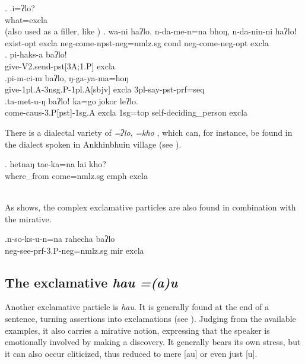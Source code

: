 \ex. \ag.i=ʔlo?\\
what{\sc =excla}\\
 (also used as a filler, like )
\bg. wa-ni haʔlo. n-da-me-n=na bhoŋ, n-da-nin-ni haʔloǃ\\
			exist{\sc [3sg]-opt} {\sc excla} {\sc neg-}come{\sc [3sg]-npst-neg=nmlz.sg} {\sc cond} {\sc neg-}come{\sc [3sg]-neg-opt} {\sc excla}\\
	\bg. pi-haks-a baʔlo!\\
	give{\sc -V2.send-pst[3A;1.P]} {\sc excla}\\
	 
\bg.pi-m-ci-m baʔlo, ŋ-ga-ya-ma=hoŋ\\
 give{\sc -1pl.A-3nsg.P-1pl.A[sbjv]} {\sc excla} {\sc 3pl-}say{\sc -pst-prf=seq}\\
  \bg.ta-met-u-ŋ baʔloǃ  ka=go     jokor leʔlo.\\
come{\sc -caus-3.P[pst]-1sg.A} {\sc excla} {\sc 1sg=top} self-deciding\_person {\sc excla}\\
  

There is a dialectal variety of \emph{=ʔlo}, \emph{=kho} , which can, for instance, be found in the dialect spoken in Ankhinbhuin village (see \Next).

\exg. hetnaŋ tae-ka=na lai kho?\\
			where\_from come{=nmlz.sg} {\sc emph} {\sc excla}\\\
	
	
As \Next shows, the complex exclamative particles are also found in combination  with the mirative.
 
  \exg.n-so-ks-u-n=na  rahecha baʔlo\\
  {\sc neg-}see{\sc -prf-3.P-neg=nmlz.sg} {\sc mir} {\sc excla}\\
  \rede{Oh, he has not seen it!}\source{34\_pea\_04.039}
	
\subsection{The exclamative \emph{hau} \ti \emph{=(a)u}} 

Another exclamative particle is \emph{hau}. It is generally found at the end of a sentence, turning assertions into exclamations (see \Next). Judging from the available examples, it also carries a mirative notion, expressing that the speaker is emotionally involved by making a discovery. It generally bears its own stress, but it can also occur cliticized, thus reduced to mere [au] or even just [u]. 

